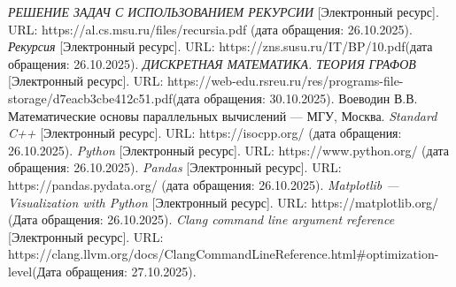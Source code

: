 \begin{thebibliography}{}
	\textit {РЕШЕНИЕ ЗАДАЧ С ИСПОЛЬЗОВАНИЕМ РЕКУРСИИ} [Электронный ресурс]. URL: https://al.cs.msu.ru/files/recursia.pdf (дата обращения: 26.10.2025).
	\textit {Рекурсия} [Электронный ресурс]. URL: 
	https://zns.susu.ru/IT/BP/10.pdf(дата обращения: 26.10.2025).
	\textit {ДИСКРЕТНАЯ МАТЕМАТИКА. ТЕОРИЯ ГРАФОВ} [Электронный ресурс]. URL: https://web-edu.rsreu.ru/res/programs-file-storage/d7eacb3cbe412c51.pdf(дата обращения: 30.10.2025).
	 Воеводин В.В. Математические основы параллельных вычислений --- МГУ, Москва.
	\textit {Standard C++} [Электронный ресурс]. URL: 
	https://isocpp.org/ (дата обращения: 26.10.2025).
	\textit {Python} [Электронный ресурс]. URL: https://www.python.org/ (дата обращения: 26.10.2025).
	\textit {Pandas} [Электронный ресурс]. URL: https://pandas.pydata.org/ (дата обращения: 26.10.2025).
	\textit {Matplotlib --- Visualization with Python} [Электронный ресурс]. URL:  https://matplotlib.org/ (Дата обращения: 26.10.2025).
	\textit {Clang command line argument reference} [Электронный ресурс]. URL: https://clang.llvm.org/docs/ClangCommandLineReference.html\#optimization-level(Дата обращения: 27.10.2025).
\end{thebibliography}

